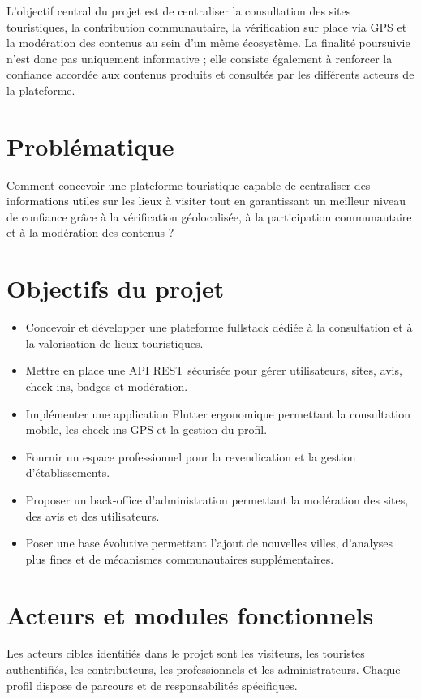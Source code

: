 ﻿\documentclass[12pt,a4paper]{report}
\begin{document}
L'objectif central du projet est de centraliser la consultation des sites touristiques, la contribution communautaire, la v\'erification sur place via GPS et la mod\'eration des contenus au sein d'un m\^eme \'ecosyst\`eme. La finalit\'e poursuivie n'est donc pas uniquement informative ; elle consiste \'egalement \`a renforcer la confiance accord\'ee aux contenus produits et consult\'es par les diff\'erents acteurs de la plateforme.

\section{Probl\'ematique}
Comment concevoir une plateforme touristique capable de centraliser des informations utiles sur les lieux \`a visiter tout en garantissant un meilleur niveau de confiance gr\^ace \`a la v\'erification g\'eolocalis\'ee, \`a la participation communautaire et \`a la mod\'eration des contenus ?

\section{Objectifs du projet}
\begin{itemize}
  \item Concevoir et d\'evelopper une plateforme fullstack d\'edi\'ee \`a la consultation et \`a la valorisation de lieux touristiques.
  \item Mettre en place une API REST s\'ecuris\'ee pour g\'erer utilisateurs, sites, avis, check-ins, badges et mod\'eration.
  \item Impl\'ementer une application Flutter ergonomique permettant la consultation mobile, les check-ins GPS et la gestion du profil.
  \item Fournir un espace professionnel pour la revendication et la gestion d'\'etablissements.
  \item Proposer un back-office d'administration permettant la mod\'eration des sites, des avis et des utilisateurs.
  \item Poser une base \'evolutive permettant l'ajout de nouvelles villes, d'analyses plus fines et de m\'ecanismes communautaires suppl\'ementaires.
\end{itemize}

\section{Acteurs et modules fonctionnels}
Les acteurs cibles identifi\'es dans le projet sont les visiteurs, les touristes authentifi\'es, les contributeurs, les professionnels et les administrateurs. Chaque profil dispose de parcours et de responsabilit\'es sp\'ecifiques.
\end{document}
